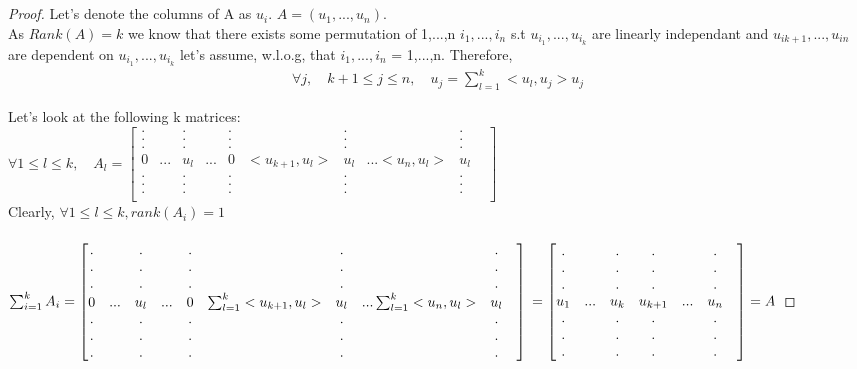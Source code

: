 \documentclass{article}
\begin{document}
	\subsection{}
	\begin{proof}	
	Let's denote the columns of A as $u_{i}$. $A=(u_{1},..., u_{n}).$\\
	As $Rank(A)=k$ we know that there exists some permutation of 1,...,n  $i_{1},...,i_{n}$ s.t  $u_{i_{1}},...,u_{i_{k}}$ are linearly independant and $u_{i{k+1}},...,u_{i{n}}$ are dependent on $u_{i_{1}},...,u_{i_{k}}$
	let's assume, w.l.o.g, that $i_{1},...,i_{n}$ = 1,...,n.
	Therefore, 
	\begin{gather*}
	\forall j, \quad k+1 \leq j\leq n, \quad u_{j} = \sum_{l=1}^{k}<u_{l}, u_{j}>u_{j}
	\end{gather*}	

	Let's look at the following k matrices:\\
	$\forall 1 \leq l \leq k, \quad A_{l}=
	\begin{bmatrix}
	. &  & . &&.&&.&&.\\
	. &  & . &&.&&.&&.\\
	. &  & . &&.&&.&&.\\
	0 &...& u_{l} &... & 0 &<u_{k+1}, u_{l}>&u_{l}& ... <u_{n}, u_{l}>&u_{l}&\\
	. &  & . &&.&&.&&.\\
	. &  & . &&.&&.&&.\\
	. &  & . &&.&&.&&.\\	
	\end{bmatrix}$\\
	Clearly, $\forall 1 \leq l \leq k, rank(A_{i})=1$\\\\
	$\sum_{i=1}^{k}A_{i}=
	\begin{bmatrix}
	. &  & . &&.&&.&&.\\
	. &  & . &&.&&.&&.\\
	. &  & . &&.&&.&&.\\
	0 &...& u_{l} &... & 0 &\sum_{l=1}^{k}<u_{k+1}, u_{l}>&u_{l}& ... \sum_{l=1}^{k}<u_{n}, u_{l}>&u_{l}&\\
	. &  & . &&.&&.&&.\\
	. &  & . &&.&&.&&.\\
	. &  & . &&.&&.&&.\\	
	\end{bmatrix}\\	
	=	\begin{bmatrix}
	. &  & . &.&&.\\
	. &  & . &.&&.\\
	. &  & . &.&&.\\
	u_{1} &...& u_{k} &u_{k+1}& ...& u_{n}&\\
	. &  & . &.&&.\\
	. &  & . &.&&.\\
	. &  & . &.&&.\\
	\end{bmatrix}= A\\	
$
\end{proof}	
\end{document}

